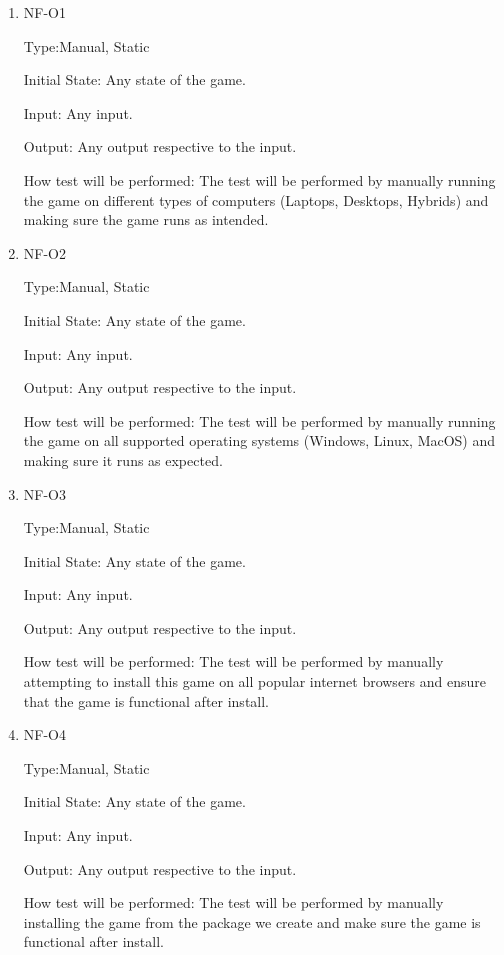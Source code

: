 \documentclass[12pt, titlepage]{article}
\begin{document}
\begin{enumerate}

\item{NF-O1\\}

Type:Manual, Static 
					
Initial State: Any state of the game.
					
Input: Any input. 
					
Output: Any output respective to the input.
					
How test will be performed: The test will be performed by manually running the game on different types of computers (Laptops, Desktops, Hybrids) and making sure the game runs as intended.

\item{NF-O2\\}

Type:Manual, Static 
					
Initial State: Any state of the game.
					
Input: Any input. 
					
Output: Any output respective to the input.
					
How test will be performed: The test will be performed by manually running the game on all supported operating systems (Windows, Linux, MacOS) and making sure it runs as expected.

\item{NF-O3\\}

Type:Manual, Static 
					
Initial State: Any state of the game.
					
Input: Any input. 
					
Output: Any output respective to the input.
					
How test will be performed: The test will be performed by manually attempting to install this game on all popular internet browsers and ensure that the game is functional after install.

\item{NF-O4\\}

Type:Manual, Static 
					
Initial State: Any state of the game.
					
Input: Any input. 
					
Output: Any output respective to the input.
					
How test will be performed: The test will be performed by manually installing the game from the package we create and make sure the game is functional after install.


\end{enumerate}
\end{document}
